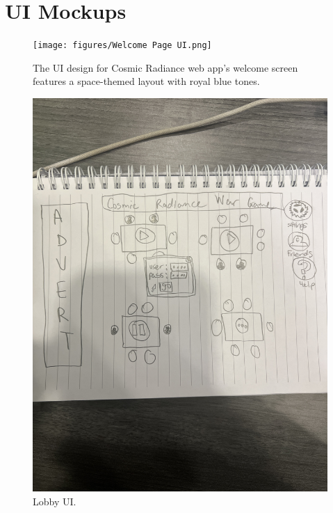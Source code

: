 \documentclass[12pt]{article} %
\begin{document}
\section {UI Mockups}
\begin{figure}
    \centering
    \texttt{[image: figures/Welcome Page UI.png]}
    \caption{The UI design for Cosmic Radiance web app's welcome screen features a space-themed layout with royal blue tones.}
    \label{fig:enter-label}
\end{figure}

\begin{figure}
    \centering
    \includegraphics[width=1\linewidth]{figures/Lobby UI.jpeg}
    \caption{Lobby UI.}
    \label{fig:enter-label}
\end{figure}
\end{document}
